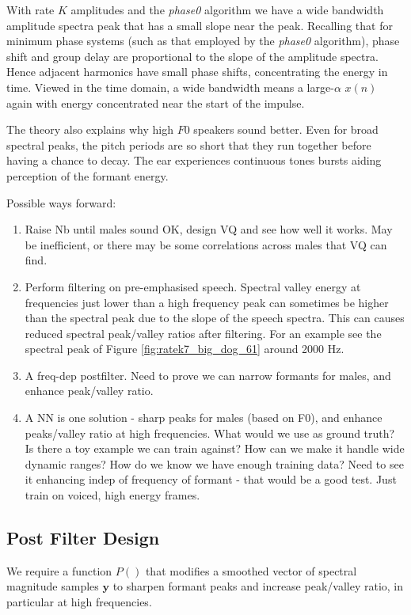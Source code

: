\documentclass{article}
\begin{document}
With rate $K$ amplitudes and the \emph{phase0} algorithm we have a wide bandwidth amplitude spectra peak that has a small slope near the peak.  Recalling that for minimum phase systems (such as that employed by the \emph{phase0} algorithm), phase shift and group delay are proportional to the slope of the amplitude spectra. Hence adjacent harmonics have small phase shifts, concentrating the energy in time.  Viewed in the time domain, a wide bandwidth means a large-$\alpha$ $x(n)$ again with energy concentrated near the start of the impulse.

The theory also explains why high $F0$ speakers sound better.  Even for broad spectral peaks, the pitch periods are so short that they run together before having a chance to decay.  The ear experiences continuous tones bursts aiding perception of the formant energy.

Possible ways forward:
\begin{enumerate}
\item Raise Nb until males sound OK, design VQ and see how well it works.  May be inefficient, or there may be some correlations across males that VQ can find.
\item Perform filtering on pre-emphasised speech.  Spectral valley energy at frequencies just lower than a high frequency peak can sometimes be higher than the spectral peak due to the slope of the speech spectra.  This can causes reduced spectral peak/valley ratios after filtering.  For an example see the spectral peak of Figure \ref{fig:ratek7_big_dog_61} around 2000 Hz.
\item A freq-dep postfilter.  Need to prove we can narrow formants for males, and enhance peak/valley ratio.
\item A NN is one solution - sharp peaks for males (based on F0), and enhance peaks/valley ratio at high frequencies.  What would we use as ground truth?  Is there a toy example we can train against?  How can we make it handle wide dynamic ranges?  How do we know we have enough training data? Need to see it enhancing indep of frequency of formant - that would be a good test.  Just train on voiced, high energy frames.
\end{enumerate}

\subsection{Post Filter Design}

We require a function $P()$ that modifies a smoothed vector of spectral magnitude samples $\mathbf{y}$ to sharpen formant peaks and increase peak/valley ratio, in particular at high frequencies.
\end{document}
